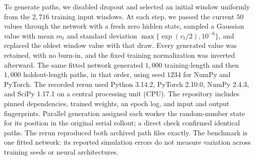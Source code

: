 To generate paths, we disabled dropout and selected an initial
window uniformly from the $2{,}716$ training input windows. At each
step, we passed the current $50$ values through the network with a
fresh zero hidden state, sampled a Gaussian value with mean $m_t$
and standard deviation $\max\{\exp(v_t/2),10^{-6}\}$, and replaced
the oldest window value with that draw. Every generated value was
retained, with no burn-in, and the fixed training normalization was
inverted afterward. The same fitted network generated $1{,}000$
training-length and then $1{,}000$ holdout-length paths, in that
order, using seed $1234$ for NumPy and PyTorch. The recorded rerun
used Python 3.14.2, PyTorch 2.10.0, NumPy 2.4.3, and SciPy
1.17.1 on a central processing unit (CPU). The repository includes pinned dependencies,
trained weights, an epoch log, and input and output fingerprints.
Parallel generation assigned each worker the random-number state
for its position in the original serial rollout; a direct check
confirmed identical paths. The rerun reproduced both archived path
files exactly. The benchmark is one fitted network:
its reported simulation errors do not measure variation across
training seeds or neural architectures.


